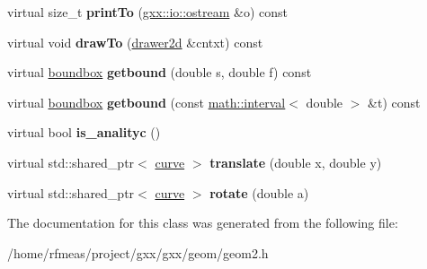 \begin{DoxyCompactItemize}
\item 
virtual size\+\_\+t {\bfseries print\+To} (\hyperlink{classgxx_1_1io_1_1ostream}{gxx\+::io\+::ostream} \&o) const \hypertarget{classgxx_1_1geom2_1_1curve_a7b2b797ae4e46c0f8d8afd34fa96b7b2}{}\label{classgxx_1_1geom2_1_1curve_a7b2b797ae4e46c0f8d8afd34fa96b7b2}

\item 
virtual void {\bfseries draw\+To} (\hyperlink{classgxx_1_1drawer2d}{drawer2d} \&cntxt) const \hypertarget{classgxx_1_1geom2_1_1curve_a46cca40ecc2dbdd16b7c03bcee4459d3}{}\label{classgxx_1_1geom2_1_1curve_a46cca40ecc2dbdd16b7c03bcee4459d3}

\item 
virtual \hyperlink{structgxx_1_1geom2_1_1boundbox}{boundbox} {\bfseries getbound} (double s, double f) const \hypertarget{classgxx_1_1geom2_1_1curve_a7c6d834c3fb4e5a7b67965a48631bd41}{}\label{classgxx_1_1geom2_1_1curve_a7c6d834c3fb4e5a7b67965a48631bd41}

\item 
virtual \hyperlink{structgxx_1_1geom2_1_1boundbox}{boundbox} {\bfseries getbound} (const \hyperlink{classgxx_1_1math_1_1interval}{math\+::interval}$<$ double $>$ \&t) const \hypertarget{classgxx_1_1geom2_1_1curve_a7e13d3fcd4107ae44cbb77374c70ff46}{}\label{classgxx_1_1geom2_1_1curve_a7e13d3fcd4107ae44cbb77374c70ff46}

\item 
virtual bool {\bfseries is\+\_\+analityc} ()\hypertarget{classgxx_1_1geom2_1_1curve_ace29dec87aeaededcf8f6ad4d67aca23}{}\label{classgxx_1_1geom2_1_1curve_ace29dec87aeaededcf8f6ad4d67aca23}

\item 
virtual std\+::shared\+\_\+ptr$<$ \hyperlink{classgxx_1_1geom2_1_1curve}{curve} $>$ {\bfseries translate} (double x, double y)\hypertarget{classgxx_1_1geom2_1_1curve_a4d9d1bbdfba0a76a989043eaed94d078}{}\label{classgxx_1_1geom2_1_1curve_a4d9d1bbdfba0a76a989043eaed94d078}

\item 
virtual std\+::shared\+\_\+ptr$<$ \hyperlink{classgxx_1_1geom2_1_1curve}{curve} $>$ {\bfseries rotate} (double a)\hypertarget{classgxx_1_1geom2_1_1curve_a316c920a9348fb891a5b2324f9f3a355}{}\label{classgxx_1_1geom2_1_1curve_a316c920a9348fb891a5b2324f9f3a355}

\end{DoxyCompactItemize}


The documentation for this class was generated from the following file\+:\begin{DoxyCompactItemize}
\item 
/home/rfmeas/project/gxx/gxx/geom/geom2.\+h\end{DoxyCompactItemize}
